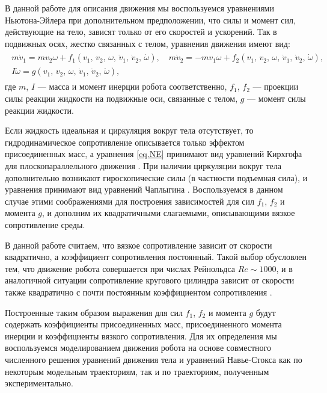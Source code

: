 В данной работе для описания движения мы воспользуемся уравнениями Ньютона-Эйлера при дополнительном предположении, что силы и момент сил, действующие на тело, зависят только от его скоростей и ускорений. Так в подвижных осях, жестко связанных с телом, уравнения движения имеют вид:
\begin{gather}
\begin{gathered}
m \dot{v}_1 = m v_2 \omega + f_1 (v_1,\, v_2,\, \omega,\, \dot{v}_1,\, \dot{v}_2,\, \dot \omega),\quad m \dot{v}_2 = -m v_1 \omega + f_2 (v_1,\, v_2,\, \omega,\, \dot{v}_1,\, \dot{v}_2,\, \dot \omega),\\
I \dot{\omega} = g (v_1,\, v_2,\, \omega,\, \dot{v}_1,\, \dot{v}_2,\, \dot \omega),
\end{gathered}\label{eq.NE}
\end{gather}
где $m$, $I$ --- масса и момент инерции робота соответственно, $f_1$, $f_2$ --- проекции силы реакции жидкости на подвижные оси, связанные с телом, $g$ --- момент силы реакции жидкости. 

Если жидкость идеальная и циркуляция вокруг тела отсутствует, то гидродинамическое сопротивление описывается только эффектом присоединенных масс, а уравнения \eqref{eq.NE} принимают вид уравнений Кирхгофа для плоскопараллельного движения \cite{Kirchhoff}. При наличии циркуляции вокруг тела дополнительно возникают гироскопические силы (в частности подъемная сила), и уравнения принимают вид уравнений Чаплыгина \cite{Borisov_Mamaev, Chaplygin}. Воспользуемся в данном случае этими соображениями для построения зависимостей для сил $f_1$, $f_2$ и момента $g$, и дополним их квадратичными слагаемыми, описывающими вязкое сопротивление среды.

В данной работе считаем, что вязкое сопротивление зависит от скорости квадратично, а коэффициент сопротивления постоянный. Такой выбор обусловлен тем, что движение робота совершается при числах Рейнольдса $Re \sim 1000$, и в аналогичной ситуации сопротивление кругового цилиндра зависит от скорости также квадратично с почти постоянным коэффициентом сопротивления \cite{Schlichting}.

Построенные таким образом выражения для сил $f_1$, $f_2$ и момента $g$ будут содержать коэффициенты присоединенных масс, присоединенного момента инерции и коэффициенты вязкого сопротивления. Для их определения мы воспользуемся моделированием движения робота на основе совместного численного решения уравнений движения тела и уравнений Навье-Стокса как по некоторым модельным траекториям, так и по траекториям, полученным экспериментально.

